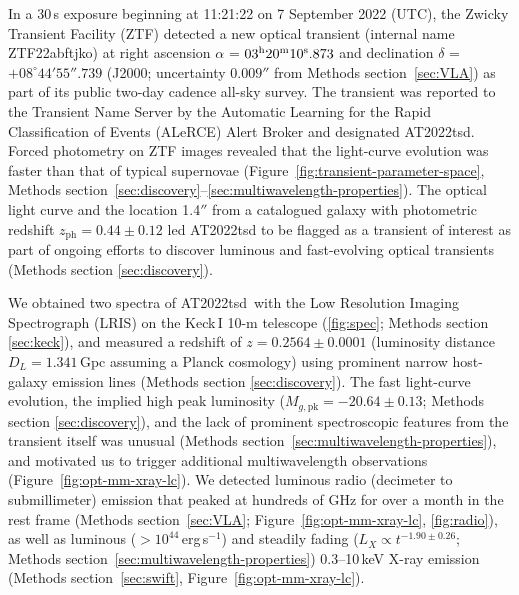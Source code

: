 \documentclass{nature_plusfigure}
\newcommand{\at}{AT2022tsd}
\begin{document}
In a 30\,s exposure beginning at 11:21:22 on 7 September 2022 (UTC), the Zwicky Transient Facility (ZTF\cite{Graham2019,Bellm2019}) detected a new optical transient (internal name ZTF22abftjko) at right ascension $\alpha$ = $03^{\rm{h}}20^{\rm{m}}10^{\rm{s}}.873$ and declination $\delta$ = $+08^{\circ} 44' 55''.739$ 
(J2000; uncertainty $0.009''$ from Methods section~\ref{sec:VLA}) as part of its public two-day cadence all-sky survey.
The transient was reported\cite{Munoz-Arancibia2022} to the Transient Name Server by the Automatic Learning for the Rapid Classification of Events (ALeRCE) Alert Broker\cite{Forster2021} and designated AT2022tsd.
Forced photometry on ZTF images\cite{Masci2019} revealed that the light-curve evolution was faster than that of typical supernovae (Figure~\ref{fig:transient-parameter-space}, Methods section~\ref{sec:discovery}--\ref{sec:multiwavelength-properties}).
The optical light curve and the location 1.4$''$ from a catalogued\cite{Beck2021} galaxy with photometric redshift $z_\mathrm{ph}=0.44\pm0.12$ led AT2022tsd to be flagged as a transient of interest as part of ongoing efforts to discover luminous and fast-evolving optical transients (Methods section \ref{sec:discovery}).

We obtained two spectra of \at\ with the Low Resolution Imaging Spectrograph (LRIS\cite{Oke1995}) on the Keck\,I 10-m telescope (\ref{fig:spec}; Methods section \ref{sec:keck}), and measured\cite{Ho2022_Astronote_Keck} a redshift of $z=0.2564\pm0.0001$ (luminosity distance $D_L=1.341\,$Gpc assuming a Planck cosmology\cite{Planck2020}) using prominent narrow host-galaxy emission lines (Methods section \ref{sec:discovery}). 
The fast light-curve evolution, the implied high peak luminosity ($M_{g,\mathrm{pk}}=-20.64\pm0.13$; Methods section \ref{sec:discovery}), and the lack of prominent spectroscopic features from the transient itself was unusual (Methods section~\ref{sec:multiwavelength-properties}), and motivated us to trigger additional multiwavelength observations (Figure~\ref{fig:opt-mm-xray-lc}).
We detected luminous radio (decimeter\cite{Ho2022Astronote_radio} to submillimeter) emission that peaked at hundreds of GHz for over a month in the rest frame (Methods section~\ref{sec:VLA}; Figure~\ref{fig:opt-mm-xray-lc}, \ref{fig:radio}),
as well as luminous ($>10^{44}\,$erg\,s$^{-1}$) and steadily fading ($L_X\propto t^{-1.90\pm0.26}$; Methods section~\ref{sec:multiwavelength-properties}) 0.3--10\,keV X-ray emission\cite{Schulze2022Astronote_xray} (Methods section~\ref{sec:swift}, Figure~\ref{fig:opt-mm-xray-lc}).
\end{document}
